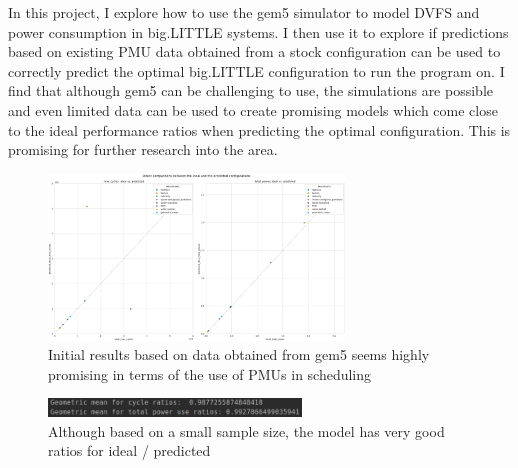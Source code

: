 In this project, I explore how to use the gem5 simulator to model DVFS and 
power consumption in big.LITTLE systems. I then use it to explore if 
predictions based on existing PMU data obtained from a stock configuration can 
be used to correctly predict the optimal big.LITTLE configuration to run the 
program on. I find that although gem5 can be challenging to use, the simulations
are possible and even limited data can be used to create promising models which 
come close to the ideal performance ratios when predicting the optimal 
configuration. This is promising for further research into the area.
\begin{figure}[H]
    \centering
    \includegraphics[width=0.7\textwidth]{result-plots/stock-2b2L/system-scatter.png}
    \caption{Initial results based on data obtained from gem5 seems highly
             promising in terms of the use of PMUs in scheduling}
\end{figure}
\begin{figure}[H]
    \centering
    \includegraphics[width=0.6\textwidth]{screenshots/promising-geomeans.png}
    \caption{Although based on a small sample size, the model has very good
             ratios for ideal / predicted}
\end{figure}
